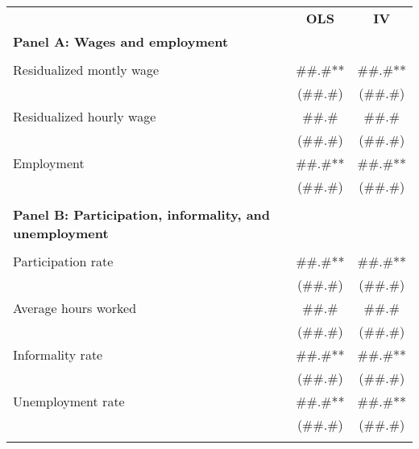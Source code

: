 \begin{tabular}{rcc}
\toprule
      & \multirow{2}[2]{*}{\textbf{OLS}} & \multirow{2}[2]{*}{\textbf{IV}} \\
      &       &  \\
\cmidrule{2-3}\multicolumn{1}{l}{\textbf{Panel A: Wages and employment}} &       &  \\
      &       &  \\
\multicolumn{1}{l}{Residualized montly wage} & \#\#.\#** & \#\#.\#** \\
      & (\#\#.\#) & (\#\#.\#) \\
\multicolumn{1}{l}{Residualized hourly wage} & \#\#.\# & \#\#.\# \\
      & (\#\#.\#) & (\#\#.\#) \\
\multicolumn{1}{l}{Employment } & \#\#.\#** & \#\#.\#** \\
      & (\#\#.\#) & (\#\#.\#) \\
      &       &  \\
\multicolumn{1}{l}{\textbf{Panel B: Participation, informality, and unemployment}} &       &  \\
      &       &  \\
\multicolumn{1}{l}{Participation rate} & \#\#.\#** & \#\#.\#** \\
      & (\#\#.\#) & (\#\#.\#) \\
\multicolumn{1}{l}{Average hours worked} & \#\#.\# & \#\#.\# \\
      & (\#\#.\#) & (\#\#.\#) \\
\multicolumn{1}{l}{Informality rate} & \#\#.\#** & \#\#.\#** \\
      & (\#\#.\#) & (\#\#.\#) \\
\multicolumn{1}{l}{Unemployment rate} & \#\#.\#** & \#\#.\#** \\
      & (\#\#.\#) & (\#\#.\#) \\
      &       &  \\
\bottomrule
\end{tabular}%
